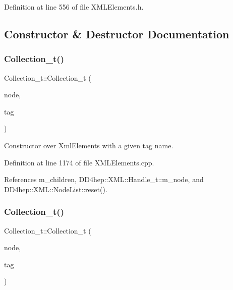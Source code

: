 Definition at line 556 of file X\+M\+L\+Elements.\+h.



\subsection{Constructor \& Destructor Documentation}
\hypertarget{class_d_d4hep_1_1_x_m_l_1_1_collection__t_a46561de1f154c3b06435766504b9d3db}{}\label{class_d_d4hep_1_1_x_m_l_1_1_collection__t_a46561de1f154c3b06435766504b9d3db} 
\subsubsection{\texorpdfstring{Collection\+\_\+t()}{Collection\_t()}\hspace{0.1cm}{\footnotesize\ttfamily [1/3]}}
{\footnotesize\ttfamily Collection\+\_\+t\+::\+Collection\+\_\+t (\begin{DoxyParamCaption}\item[{\hyperlink{class_d_d4hep_1_1_x_m_l_1_1_handle__t}{Handle\+\_\+t}}]{node,  }\item[{const \hyperlink{namespace_d_d4hep_1_1_x_m_l_a09e5d9cc86ed782f6826dfe0778c1815}{Xml\+Char} $\ast$}]{tag }\end{DoxyParamCaption})}



Constructor over Xml\+Elements with a given tag name. 



Definition at line 1174 of file X\+M\+L\+Elements.\+cpp.



References m\+\_\+children, D\+D4hep\+::\+X\+M\+L\+::\+Handle\+\_\+t\+::m\+\_\+node, and D\+D4hep\+::\+X\+M\+L\+::\+Node\+List\+::reset().

\hypertarget{class_d_d4hep_1_1_x_m_l_1_1_collection__t_a65effa5c14bd2aef11552cc9737022f9}{}\label{class_d_d4hep_1_1_x_m_l_1_1_collection__t_a65effa5c14bd2aef11552cc9737022f9} 
\subsubsection{\texorpdfstring{Collection\+\_\+t()}{Collection\_t()}\hspace{0.1cm}{\footnotesize\ttfamily [2/3]}}
{\footnotesize\ttfamily Collection\+\_\+t\+::\+Collection\+\_\+t (\begin{DoxyParamCaption}\item[{\hyperlink{class_d_d4hep_1_1_x_m_l_1_1_handle__t}{Handle\+\_\+t}}]{node,  }\item[{const char $\ast$}]{tag }\end{DoxyParamCaption})}



